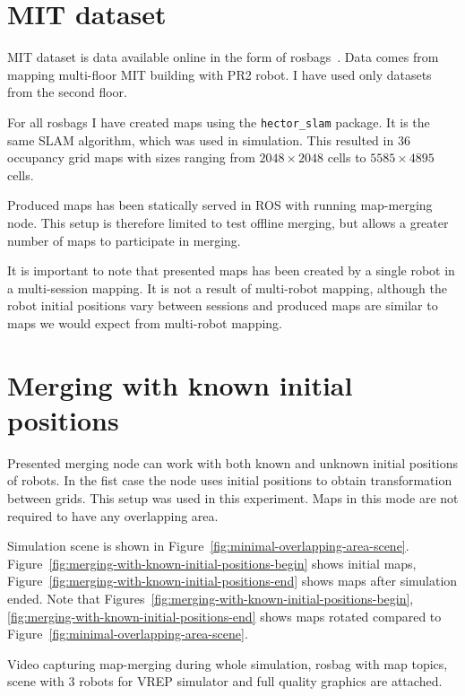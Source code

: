 \section{\gls{MIT} dataset}
\label{sec:mit-dataset}

\gls{MIT} dataset is data available online in the form of rosbags~\cite{Fallon2013}. Data comes from mapping multi-floor \gls{MIT} building with PR2 robot. I have used only datasets from the second floor.

For all rosbags I have created maps using the \texttt{hector\_slam} package. It is the same \gls{SLAM} algorithm, which was used in simulation. This resulted in $36$ occupancy grid maps with sizes ranging from $2048 \times 2048$ cells to $5585 \times 4895$ cells.

Produced maps has been statically served in \gls{ROS} with running map-merging node. This setup is therefore limited to test offline merging, but allows a greater number of maps to participate in merging.

It is important to note that presented maps has been created by a single robot in a multi-session mapping. It is not a result of multi-robot mapping, although the robot initial positions vary between sessions and produced maps are similar to maps we would expect from multi-robot mapping.

\section{Merging with known initial positions}
\label{sec:merging-with-known-initial-positions}

Presented merging node can work with both known and unknown initial positions of robots. In the fist case the node uses initial positions to obtain transformation between grids. This setup was used in this experiment. Maps in this mode are not required to have any overlapping area.

Simulation scene is shown in Figure~\ref{fig:minimal-overlapping-area-scene}. Figure~\ref{fig:merging-with-known-initial-positions-begin} shows initial maps, Figure~\ref{fig:merging-with-known-initial-positions-end} shows maps after simulation ended. Note that Figures~\ref{fig:merging-with-known-initial-positions-begin}, \ref{fig:merging-with-known-initial-positions-end} shows maps rotated compared to Figure~\ref{fig:minimal-overlapping-area-scene}.

Video capturing map-merging during whole simulation, rosbag with map topics, scene with $3$ robots for \gls{VREP} simulator and full quality graphics are attached.

